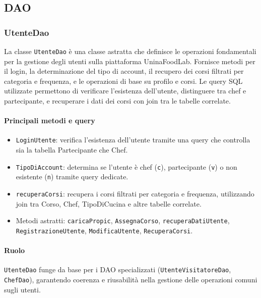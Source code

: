 \subsection{DAO}

\subsubsection{UtenteDao}
La classe \texttt{UtenteDao} è una classe astratta che definisce le operazioni fondamentali per la gestione degli utenti sulla piattaforma UninaFoodLab. Fornisce metodi per il login, la determinazione del tipo di account, il recupero dei corsi filtrati per categoria e frequenza, e le operazioni di base su profilo e corsi. Le query SQL utilizzate permettono di verificare l'esistenza dell'utente, distinguere tra chef e partecipante, e recuperare i dati dei corsi con join tra le tabelle correlate.

\paragraph{Principali metodi e query}
\begin{itemize}
    \item \texttt{LoginUtente}: verifica l'esistenza dell'utente tramite una query che controlla sia la tabella Partecipante che Chef.
    \item \texttt{TipoDiAccount}: determina se l'utente è chef (\texttt{c}), partecipante (\texttt{v}) o non esistente (\texttt{n}) tramite query dedicate.
    \item \texttt{recuperaCorsi}: recupera i corsi filtrati per categoria e frequenza, utilizzando join tra Corso, Chef, TipoDiCucina e altre tabelle correlate.
    \item Metodi astratti: \texttt{caricaPropic}, \texttt{AssegnaCorso}, \texttt{recuperaDatiUtente}, \texttt{RegistrazioneUtente}, \texttt{ModificaUtente}, \texttt{RecuperaCorsi}.
\end{itemize}

\paragraph{Ruolo}
\texttt{UtenteDao} funge da base per i DAO specializzati (\texttt{UtenteVisitatoreDao}, \texttt{ChefDao}), garantendo coerenza e riusabilità nella gestione delle operazioni comuni sugli utenti.

